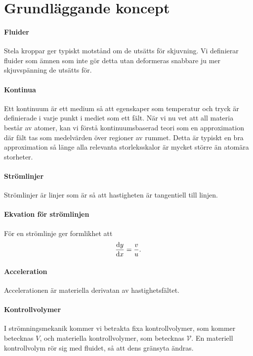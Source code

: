 \section{Grundläggande koncept}

\paragraph{Fluider}
Stela kroppar ger typiskt motstånd om de utsätts för skjuvning. Vi definierar fluider som ämnen som inte gör detta utan deformeras snabbare ju mer skjuvspänning de utsätts för.

\paragraph{Kontinua}
Ett kontinuum är ett medium så att egenskaper som temperatur och tryck är definierade i varje punkt i mediet som ett fält. När vi nu vet att all materia består av atomer, kan vi förstå kontinuumsbaserad teori som en approximation där fält tas som medelvärden över regioner av rummet. Detta är typiskt en bra approximation så länge alla relevanta storleksskalor är mycket större än atomära storheter.

\paragraph{Strömlinjer}
Strömlinjer är linjer som är så att hastigheten är tangentiell till linjen.

\paragraph{Ekvation för strömlinjen}
För en strömlinje ger formlikhet att
\begin{align*}
	\dv{y}{x} = \frac{v}{u}.
\end{align*}

\paragraph{Acceleration}
Accelerationen är materiella derivatan av hastighetsfältet.

\paragraph{Kontrollvolymer}
I strömningsmekanik kommer vi betrakta fixa kontrollvolymer, som kommer betecknas $V$, och materiella kontrollvolymer, som betecknas $\mathcal{V}$. En materiell kontrollvolym rör sig med fluidet, så att dens gränsyta ändras.

